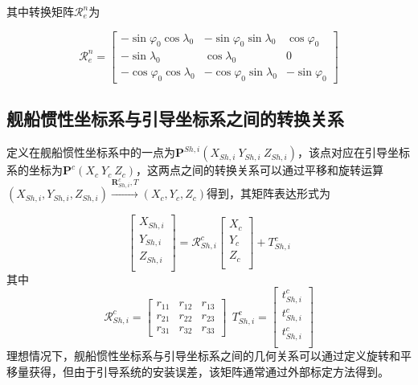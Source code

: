其中转换矩阵$\mathcal{R}_e^n$为

\begin{equation}
	\mathcal{R}_e^n=\left[\begin{array}{ccc}
		-\sin \varphi _{0} \cos \lambda _{0} & -\sin \varphi _{0} \sin \lambda _{0} & \cos \varphi _{0}  \\
		-\sin \lambda _{0}           &           \cos \lambda _{0}            &          0           \\
		-\cos \varphi _{0} \cos \lambda _{0} & -\cos \varphi _{0} \sin \lambda _{0} & -\sin \varphi _{0}
	\end{array}\right]
\end{equation}

\subsection{舰船惯性坐标系与引导坐标系之间的转换关系}
定义在舰船惯性坐标系中的一点为$\mathbf{P}^{Sh,i}(X_{Sh,i}\ Y_{Sh,i}\ Z_{Sh,i})$，该点对应在引导坐标系的坐标为$\mathbf{P}^{c}(X_c\ Y_c\ Z_c)$，这两点之间的转换关系可以通过平移和旋转运算$(X_{Sh,i}, Y_{Sh,i}, Z_{Sh,i})\xrightarrow{\textbf{R}_{Sh,i}^c,T}(X_c, Y_c, Z_c) $得到，其矩阵表达形式为

\begin{equation}
	\left[\begin{array}{c}
		X_{Sh,i}\\
		Y_{Sh,i}\\
		Z_{Sh,i}\\
	\end{array}\right]=\mathcal{R}_{Sh,i}^c
	\left[\begin{array}{c}
		X_{c}\\
		Y_{c}\\
		Z_{c}\\
	\end{array}\right]+T_{Sh,i}^c
\end{equation}
其中
\begin{equation}
	\mathcal{R}_{Sh,i}^c=\left[\begin{array}{ccc}
		r_{11} & r_{12} & r_{13} \\
		r_{21} & r_{22} & r_{23} \\
		r_{31} & r_{32} & r_{33} 
	\end{array}\right]
	\ \ 
	T_{Sh,i}^c=\left[\begin{array}{ccc}
		t_{Sh,i}^c\\
		t_{Sh,i}^c\\
		t_{Sh,i}^c\\
	\end{array}\right]
\end{equation}
理想情况下，舰船惯性坐标系与引导坐标系之间的几何关系可以通过定义旋转和平移量获得，但由于引导系统的安装误差，该矩阵通常通过外部标定方法得到。




